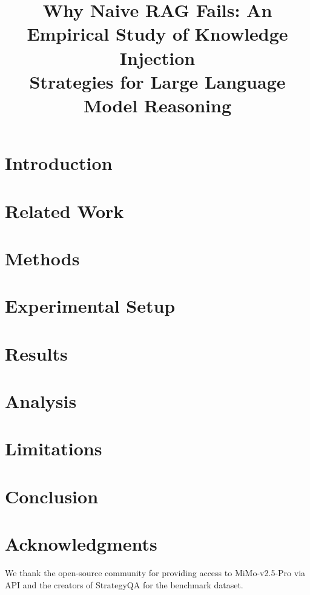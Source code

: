 \documentclass[conference]{IEEEtran}
\title{Why Naive RAG Fails: An Empirical Study of Knowledge Injection\\Strategies for Large Language Model Reasoning}
\author{
\IEEEauthorblockN{Sathvik A R}
\IEEEauthorblockA{PES University\\arsathvik48@gmail.com}
}
\begin{document}
\maketitle



\section{Introduction}


\section{Related Work}


\section{Methods}


\section{Experimental Setup}


\section{Results}


\section{Analysis}


\section{Limitations}


\section{Conclusion}


\section*{Acknowledgments}
We thank the open-source community for providing access to MiMo-v2.5-Pro via API and the creators of StrategyQA for the benchmark dataset.



\end{document}
